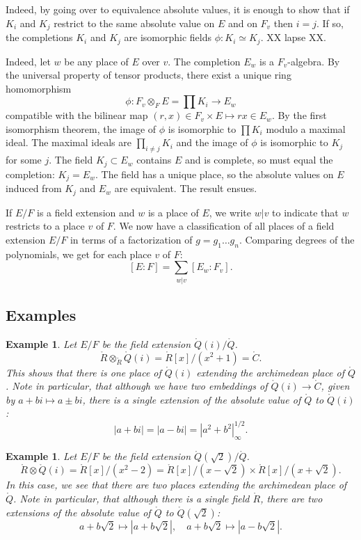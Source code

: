 \documentclass{amsart}
\newtheorem{example}[exercise]{Example}
\def\abs#1{{|#1|}}
\begin{document}
  Indeed, by going
over to equivalence absolute values, it is enough to show that if $K_i$
and $K_j$ restrict to the same absolute value on $E$ and on $F_v$
then $i=j$.  If so, the completions $K_i$ and $K_j$ are
isomorphic fields $\phi:K_i\simeq K_j$.  XX lapse XX.

  Indeed, let $w$ be any place of $E$ over $v$.
The completion $E_w$ is a $F_v$-algebra.  By the universal property
of tensor products, there exist a unique ring homomorphism 
\[
\phi:F_v\otimes_F E =\prod K_i \to E_w
\]
compatible with the bilinear map $(r,x)\in F_v\times E \mapsto r x\in E_w$.
By the first isomorphism theorem, the image of $\phi$ is isomorphic
to $\prod K_i$ modulo a maximal ideal.  The maximal ideals
are $\prod_{i\ne j} K_i$ and the image of $\phi$ is isomorphic to $K_j$ for
some $j$.  The field $K_j\subset E_w$ contains $E$ and is complete,
so must equal the completion: $K_j = E_w$.  The field has a unique place,
so the absolute values on $E$ induced from $K_j$ and $E_w$ are equivalent.
The result ensues.

If $E/F$ is a field extension and
$w$ is a place of $E$, we write $w|v$ to indicate that $w$ restricts
to a place $v$ of $F$.
We now have a classification of all places of a field extension $E/F$ in
terms of a factorization of $g = g_1\ldots g_n$. Comparing degrees of
the polynomials, we get for each place $v$ of $F$:
\[
[E:F] = \sum_{w|v} [E_w:F_v].
\]

\subsection{Examples}

\begin{example}  Let $E/F$ be the field extension $\ring{Q}(i)/\ring{Q}$.
\[
\ring{R}\otimes_\ring{R} \ring{Q}(i) = \ring{R}[x]/(x^2+1) = \ring{C}.
\]
This shows that there is one place of $\ring{Q}(i)$ extending the archimedean
place of $\ring{Q}$.  Note in particular, that although we have two embeddings
of $\ring{Q}(i)\to\ring{C}$, given by $a+bi \mapsto a \pm b i$, there is a single
extension of the absolute value of $\ring{Q}$ to $\ring{Q}(i)$:
\[
\abs{a + bi } = \abs{a - bi} = \abs{a^2 + b^2}^{1/2}_\infty.
\]
\end{example}

\begin{example} Let $E/F$ be the field extension $\ring{Q}(\sqrt{2})/\ring{Q}$.
\[
\ring{R}\otimes \ring{Q}(i) = \ring{R}[x]/(x^2 - 2) = 
\ring{R}[x]/(x - \sqrt{2}) \times
\ring{R}[x]/(x + \sqrt{2}).
\]
In this case, we see that there are two places extending the archimedean
place of $\ring{Q}$.  Note in particular, that although there is a single field
$\ring{R}$, there are two extensions of the absolute value of $\ring{Q}$ to
$\ring{Q}(\sqrt{2})$:
\[
a+ b\sqrt{2}\mapsto \abs{a + b \sqrt{2}},\quad a + b\sqrt{2}\mapsto \abs{a-b\sqrt{2}}.
\]
\end{example}
\end{document}
